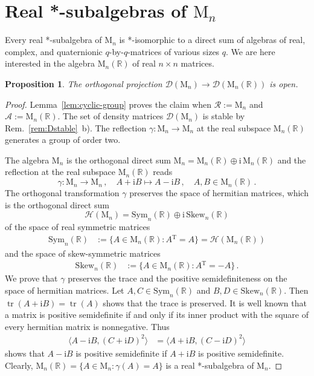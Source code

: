 \documentclass[a4paper,11pt,reqno]{amsart}
\newcommand{\R}{\mathbb{R}}
\newcommand{\M}{\mathrm{M}}
\newcommand{\cA}{\mathcal{A}}
\newcommand{\cD}{\mathcal{D}}
\newcommand{\cH}{\mathcal{H}}
\newcommand{\cR}{\mathcal{R}}
\newcommand{\ii}{\mathrm{i}}
\newcommand{\tp}{{}^\mathrm{T}}
\DeclareMathOperator\tr{tr}
\newtheorem{prop}[thm]{Proposition}
\theoremstyle{definition}
\theoremstyle{remark}
\numberwithin{equation}{section}
\begin{document}
\section{Real *-subalgebras of $\M_n$}
\label{sec:real}
%
Every real *-subalgebra of $\M_n$ is *-isomorphic \cite[Thm.~5.22]{Farenick2001} 
to a direct sum of algebras of real, complex, and quaternionic 
\mbox{$q$-by-$q$}-matrices of various sizes $q$. We are here interested in the 
algebra $\M_n(\R)$ of real $n\times n$ matrices.
\par
%
\begin{prop}\label{pro:project-real}
The orthogonal projection $\cD(\M_n)\to\cD(\M_n(\R))$ is open.
\end{prop}
%
\begin{proof}
Lemma~\ref{lem:cyclic-group} proves the claim when $\cR:=\M_n$ and 
$\cA:=\M_n(\R)$. The set of density matrices $\cD(\M_n)$ is stable 
by Rem.~\ref{rem:Dstable}~b). The reflection $\gamma:\M_n\to\M_n$ at 
the real subspace $\M_n(\R)$ generates a group of order two. 
\par
%
The algebra $\M_n$ 
is the orthogonal direct sum $\M_n=\M_n(\R)\oplus\ii\,\M_n(\R)$ and the 
reflection at the real subspace $\M_n(\R)$ reads
\[\textstyle
\gamma:
\M_n\to\M_n\,,
\quad
A+\ii B\mapsto A-\ii B\,, 
\quad
A,B\in\M_n(\R)\,.
\]  
The orthogonal transformation $\gamma$ preserves the space of hermitian matrices, 
which is the orthogonal direct sum
\[
\cH(\M_n)=\mathrm{Sym}_n(\R)\oplus\ii\,\mathrm{Skew}_n(\R)
\]
of the space of real symmetric matrices 
\begin{align*}
\mathrm{Sym}_n(\R) 
 & :=\{A\in\M_n(\R)\colon A\tp=A\}
 =\cH(\M_n(\R))
 \end{align*}
and the space of skew-symmetric matrices
\begin{align*}
\mathrm{Skew}_n(\R)
 &:=\{A\in\M_n(\R)\colon A\tp=-A\}\,.
\end{align*}
We prove that $\gamma$ preserves the trace and the positive semidefiniteness 
on the space of hermitian matrices. Let $A,C\in\mathrm{Sym}_n(\R)$ and 
$B,D\in\mathrm{Skew}_n(\R)$. Then 
$\tr(A+\ii B)=\tr(A)$ shows that the trace is preserved. It is well known 
that a matrix is positive semidefinite if and only if its inner product 
with the square of every hermitian matrix is nonnegative. Thus
\begin{align*}
\langle A-\ii B,(C+\ii D)^2\rangle
&=\langle A+\ii B,(C-\ii D)^2\rangle
\end{align*}
shows that $A-\ii B$ is positive semidefinite if $A+\ii B$ is positive 
semidefinite. Clearly, $\M_n(\R)=\{A\in\M_n:\gamma(A)=A\}$ is a real 
*-subalgebra of $\M_n$.
\end{proof}
\end{document}
